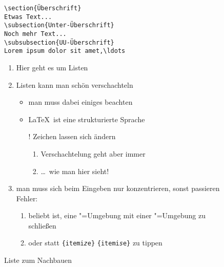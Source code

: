 \begin{uebung}
\begin{figure}[h]
\begin{minipage}[t]{.5\textwidth}
\begin{verbatim}
\section{Überschrift}
Etwas Text...
\subsection{Unter-Überschrift}
Noch mehr Text...
\subsubsection{UU-Überschrift}
Lorem ipsum dolor sit amet,\ldots

	\end{verbatim}
	\end{minipage}
	\begin{minipage}[t]{.5\textwidth}
	\caption{Liste zum Nachbauen}\label{enumerate}\small
	\begin{enumerate}
		\item Hier geht es um Listen
		\item Listen kann man schön verschachteln
		\begin{itemize}
			\item man muss dabei einiges beachten
			\item \LaTeX\ ist eine strukturierte Sprache
			\item[!] Zeichen lassen sich ändern
			\begin{enumerate} 
				\item Verschachtelung geht aber immer
				\item \dots\ wie man hier sieht!
			\end{enumerate}
		\end{itemize}
		\item man muss sich beim Eingeben nur konzentrieren, sonst 
			passieren Fehler:
		\begin{enumerate}
			\item beliebt ist, eine "=Umgebung mit 
				einer "=Umgebung zu schließen
			\item oder statt \texttt{\{itemi\textit{z}e\}} 
				\texttt{\{itemi\textit{s}e\}} zu tippen
		\end{enumerate}
	\end{enumerate}
	\end{minipage}
\end{figure}
\clearpage


\end{uebung}
